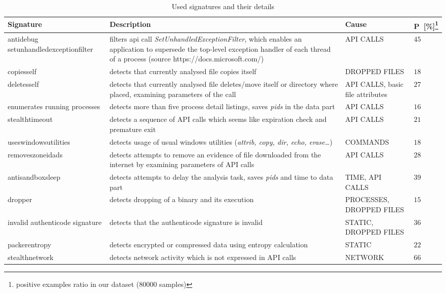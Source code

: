 \begin{table}[h]
  \centering
  \caption{Used signatures and their details}
  \begin{minipage}{\linewidth}
  \begin{tabular}{p{3.5cm}p{6cm}p{3cm}p{1.3cm}}
    \toprule
    \textbf{Signature} &
    \textbf{Description} &
    \textbf{Cause} &
    \textbf{P~[\%]\footnote[1]{positive examples ratio in our dataset (80000 samples)}}
    \\
    \midrule
    antidebug setunhandledexceptionfilter & filters api call \emph{SetUnhandledExceptionFilter}, which enables an application to supersede the top-level exception handler of each thread of a process  (source https://docs.microsoft.com/)  & API CALLS & $45$ \\
    \midrule
    copiesself & detects that currently analysed file copies itself & DROPPED FILES & $18$ \\
    \midrule
    deletesself & detects that currently analysed file deletes/move itself or directory where placed, examining parameters of the call & API CALLS, basic file attributes & $27$ \\
    \midrule
    enumerates running processes & detects more than five process detail listings, saves \emph{pids} in the data part & API CALLS & $16$ \\
    \midrule
    stealthtimeout & detects a sequence of API calls which seems like expiration check and premature exit & API CALLS & $21$ \\
    \midrule
    useswindowsutilities & detects usage of usual windows utilities (\emph{attrib, copy, dir, echo, erase\dots}) & COMMANDS & $18$ \\
    \midrule
    removeszoneidads & detects attempts to remove an evidence of file downloaded from the internet by examining parameters of API calls& API CALLS & $28$ \\
    \midrule[0.3pt]
    \midrule[0.3pt]
    antisandboxsleep & detects attempts to delay the analysis task, saves \emph{pids} and time to data part & TIME, API CALLS & $39$ \\
    \midrule
    dropper & detects dropping of a binary and its execution & PROCESSES, DROPPED FILES & $15$ \\
    \midrule
    invalid authenticode signature & detects that the authenticode signature is invalid & STATIC, DROPPED FILES & $36$ \\
    \midrule
    packerentropy & detects encrypted or compressed data using entropy calculation & STATIC & $22$ \\
    \midrule
    stealthnetwork & detects network activity which is not expressed in API calls & NETWORK & $66$ \\
    \bottomrule
  \end{tabular}
  \end{minipage}
  \label{tab:sigdet}
\end{table}

